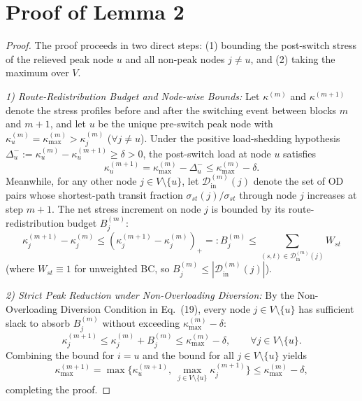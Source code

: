 \documentclass[11pt]{article}
\newcommand{\rev}[1]{#1}
\newenvironment{IEEEproof}{\begin{proof}}{\end{proof}}
\begin{document}
\section{Proof of Lemma 2}
\label{app:proof_lem_block_budget}
\begin{IEEEproof}
\rev{The proof proceeds in two direct steps: (1) bounding the post-switch stress of the relieved peak node $u$ and all non-peak nodes $j \neq u$, and (2) taking the maximum over $V$.

\noindent\textit{1) Route-Redistribution Budget and Node-wise Bounds:}
Let $\kappa^{(m)}$ and $\kappa^{(m+1)}$ denote the stress profiles before and after the switching event between blocks $m$ and $m+1$, and let $u$ be the unique pre-switch peak node with $\kappa_u^{(m)} = \kappa_{\max}^{(m)} > \kappa_j^{(m)}$ ($\forall j \neq u$). Under the positive load-shedding hypothesis $\Delta_u^- := \kappa_u^{(m)} - \kappa_u^{(m+1)} \ge \delta > 0$, the post-switch load at node $u$ satisfies
\begin{equation}
\kappa_u^{(m+1)} = \kappa_{\max}^{(m)} - \Delta_u^- \le \kappa_{\max}^{(m)} - \delta.
\end{equation}
Meanwhile, for any other node $j \in V \setminus \{u\}$, let $\mathcal{D}_{\text{in}}^{(m)}(j)$ denote the set of OD pairs whose shortest-path transit fraction $\sigma_{st}(j)/\sigma_{st}$ through node $j$ increases at step $m+1$. The net stress increment on node $j$ is bounded by its route-redistribution budget $B_j^{(m)}$:
\begin{equation}
\kappa_j^{(m+1)} - \kappa_j^{(m)} \le (\kappa_j^{(m+1)} - \kappa_j^{(m)})_+ =: B_j^{(m)} \le \sum_{(s,t)\in\mathcal{D}_{\text{in}}^{(m)}(j)} W_{st}
\end{equation}
(where $W_{st} \equiv 1$ for unweighted BC, so $B_j^{(m)} \le |\mathcal{D}_{\text{in}}^{(m)}(j)|$).

\noindent\textit{2) Strict Peak Reduction under Non-Overloading Diversion:}
By the Non-Overloading Diversion Condition in Eq.~(19), every node $j \in V \setminus \{u\}$ has sufficient slack to absorb $B_j^{(m)}$ without exceeding $\kappa_{\max}^{(m)} - \delta$:
\begin{equation}
\kappa_j^{(m+1)} \le \kappa_j^{(m)} + B_j^{(m)} \le \kappa_{\max}^{(m)} - \delta, \qquad \forall j \in V \setminus \{u\}.
\end{equation}
Combining the bound for $i=u$ and the bound for all $j \in V \setminus \{u\}$ yields
\begin{equation}
\kappa_{\max}^{(m+1)} = \max\Big\{\kappa_u^{(m+1)},\ \max_{j \in V \setminus \{u\}} \kappa_j^{(m+1)}\Big\} \le \kappa_{\max}^{(m)} - \delta,
\end{equation}
completing the proof.}
\end{IEEEproof}
\end{document}
